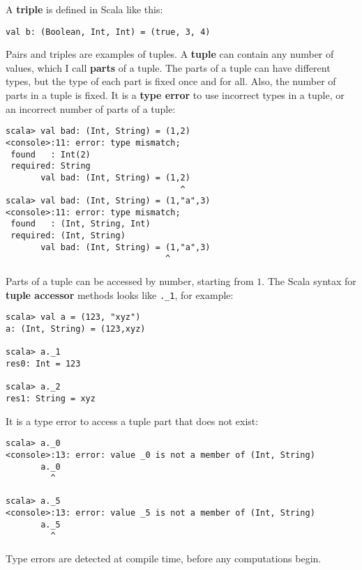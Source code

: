 A \textbf{triple} is defined in Scala like this:
\begin{lstlisting}
val b: (Boolean, Int, Int) = (true, 3, 4)
\end{lstlisting}
Pairs and triples are examples of tuples. A \textbf{tuple} can contain
any number of values, which I call \textbf{parts}
of a tuple. The parts of a tuple can have different types, but the
type of each part is fixed once and for all. Also, the number of parts
in a tuple is fixed. It is a \textbf{type error}
to use incorrect types in a tuple, or an incorrect number of parts
of a tuple:
\begin{lstlisting}
scala> val bad: (Int, String) = (1,2)
<console>:11: error: type mismatch;
 found   : Int(2)
 required: String
       val bad: (Int, String) = (1,2)
                                   ^
scala> val bad: (Int, String) = (1,"a",3)
<console>:11: error: type mismatch;
 found   : (Int, String, Int)
 required: (Int, String)
       val bad: (Int, String) = (1,"a",3)
                                ^
\end{lstlisting}
Parts of a tuple can be accessed by number, starting from $1$. The
Scala syntax for \textbf{tuple accessor} methods
looks like \lstinline!._1!,
for example:
\begin{lstlisting}
scala> val a = (123, "xyz")
a: (Int, String) = (123,xyz)

scala> a._1
res0: Int = 123

scala> a._2
res1: String = xyz 
\end{lstlisting}
It is a type error to access a tuple part that does not exist:
\begin{lstlisting}
scala> a._0
<console>:13: error: value _0 is not a member of (Int, String)
       a._0
         ^

scala> a._5
<console>:13: error: value _5 is not a member of (Int, String)
       a._5
         ^
\end{lstlisting}
Type errors are detected at compile time, before
any computations begin.

